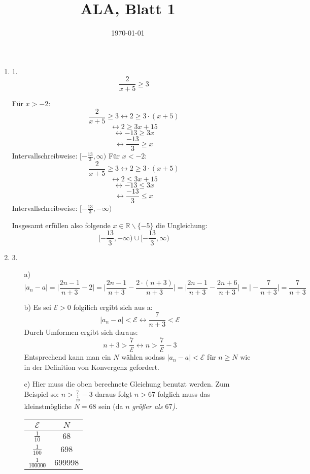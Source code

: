 \documentclass [a4paper,11pt]{article}
\title{\textbf{ALA, Blatt 1}}
\date{\today}
\begin{document}
\maketitle
	\begin {enumerate}
		\item [1.]
			$$\frac{2}{x+5} \geq 3$$

			Für $x > -2$:
				\[ \frac{2}{x+5} \geq 3 \leftrightarrow 2 \geq 3 \cdot (x+5) \]
				\[ \leftrightarrow 2 \geq 3x + 15 \]
				\[ \leftrightarrow -13 \geq 3x \]
				\[ \leftrightarrow \frac{-13}{3} \geq x \]
				Intervallschreibweise: $[-\frac{13}{3},\infty)$
			Für $x < -2$:
				\[ \frac{2}{x+5} \geq 3 \leftrightarrow 2 \geq 3 \cdot (x+5) \]
				\[ \leftrightarrow 2 \leq 3x + 15 \]
				\[ \leftrightarrow -13 \leq 3x \]
				\[ \leftrightarrow \frac{-13}{3} \leq x \]
				Intervallschreibweise: $[-\frac{13}{3},-\infty)$

			Insgesamt erfüllen also folgende $x \in \mathbb{R} \backslash \{-5\}$ die Ungleichung:
			$$[-\frac{13}{3},-\infty) \cup [-\frac{13}{3},\infty)$$
		\item[3.]
			\begin{enumerate}
				\item[a)]
					\[|a_n - a| = \Big| \frac{2n-1}{n+3}-2 \Big| =\Big| \frac{2n-1}{n+3}-\frac{2 \cdot (n+3)}{n+3}\Big|= \Big| \frac{2n-1}{n+3}-\frac{2n+6}{n+3} \Big| = \Big|-\frac{7}{n+3} \Big| =\frac{7}{n+3}\]
				\item[b)]
					Es sei $\mathcal{E} > 0$ folgilich ergibt sich aus a:
					\[|a_{n}-a| < \mathcal{E} \leftrightarrow \frac{7}{n+3} < \mathcal{E}\]
					Durch Umformen ergibt sich daraus:
					\[n+3> \frac{7}{\mathcal{E}} \leftrightarrow n> \frac{7}{\mathcal{E}}-3\]
					Entsprechend kann man ein $N$ wählen sodass $|a_{n}-a| < \mathcal{E}$ für $n \geq N$ wie in der Definition von Konvergenz gefordert.
				\item[c)]
					Hier muss die oben berechnete Gleichung benutzt werden. 
					Zum Beispiel so: $n> \frac{7}{\frac{1}{10}}-3$ daraus folgt $n > 67$ folglich muss das kleinstmögliche $N = 68$ sein (da $n$ \em{größer als} $67$).

					\begin{tabular}{c|c}
						$\mathcal{E}$ & $N$ \\ \hline
						$\frac{1}{10}$ & $68$ \\ [1.5ex]
						$\frac{1}{100}$ & $698$ \\ [1.5ex]
						$\frac{1}{100000}$ & $699998$ \\ [1.5ex]

					\end{tabular}
			\end{enumerate}
	\end {enumerate}
      
\end{document}
